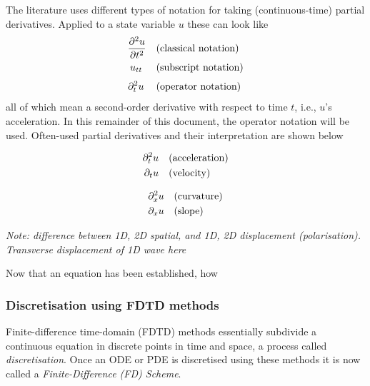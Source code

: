 The literature uses different types of notation for taking (continuous-time) partial derivatives. Applied to a state variable $u$ these can look like 
%
\begin{equation}\nonumber
    \begin{aligned}
        \frac{\partial^2 u}{\partial t^2} & \quad \text{(classical notation)}\\
        u_{tt}\:\,& \quad \text{(subscript notation)}\\[3pt]
        \partial_t^2 u\: & \quad \text{(operator notation)}
    \end{aligned}
\end{equation}
%
all of which mean a second-order derivative with respect to time $t$, i.e., $u$'s acceleration. In this remainder of this document, the operator notation will be used. Often-used partial derivatives and their interpretation  are shown below

\begin{minipage}[c]{0.49\textwidth}
    \begin{align*}
        \partial_t^2 u &\quad \text{(acceleration)}\\
        \partial_t u &\quad \text{(velocity)}
    \end{align*}
\end{minipage}
\begin{minipage}[c]{0.49\textwidth}
    \begin{align*}
    \partial_x^2 u &\quad \text{(curvature)}\\
    \partial_x u &\quad \text{(slope)}
    \end{align*}
\end{minipage}

\textit{Note: difference between 1D, 2D spatial, and 1D, 2D displacement (polarisation). Transverse displacement of 1D wave here }

Now that an equation has been established, how 


\subsubsection{Discretisation using FDTD methods}
Finite-difference time-domain (FDTD) methods essentially subdivide a continuous equation in discrete points in time and space, a process called \textit{discretisation}. Once an ODE or PDE is discretised using these methods it is now called a \textit{Finite-Difference (FD) Scheme}.


